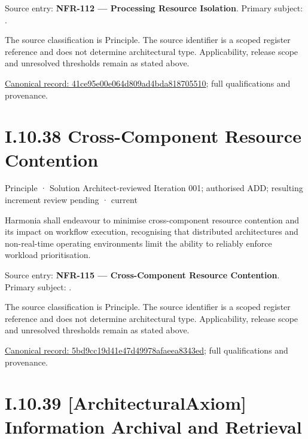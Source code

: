 Source entry: \textbf{NFR-112 — Processing Resource Isolation}. Primary subject: \texttt{}.



The source classification is Principle. The source identifier is a scoped register reference and does not determine architectural type. Applicability, release scope and unresolved thresholds remain as stated above.


{\footnotesize \href{../../../../../../../continuum/motivation/principle/41ce95e00e064d809ad4bda818705510.md}{Canonical record: 41ce95e00e064d809ad4bda818705510}; full qualifications and provenance.}\par
\section*{I.10.38 Cross-Component Resource Contention}
\label{navigation:I.10.38}

\label{element:5bd9cc19d41e47d49978afaeea8343ed}
{\small Principle · Solution Architect-reviewed Iteration 001; authorised ADD; resulting increment review pending · current}\par

Harmonia shall endeavour to minimise cross-component resource contention and its impact on workflow execution, recognising that distributed architectures and non-real-time operating environments limit the ability to reliably enforce workload prioritisation.



Source entry: \textbf{NFR-115 — Cross-Component Resource Contention}. Primary subject: \texttt{}.



The source classification is Principle. The source identifier is a scoped register reference and does not determine architectural type. Applicability, release scope and unresolved thresholds remain as stated above.


{\footnotesize \href{../../../../../../../continuum/motivation/principle/5bd9cc19d41e47d49978afaeea8343ed.md}{Canonical record: 5bd9cc19d41e47d49978afaeea8343ed}; full qualifications and provenance.}\par
\section*{I.10.39 [ArchitecturalAxiom] Information Archival and Retrieval}
\label{navigation:I.10.39}

